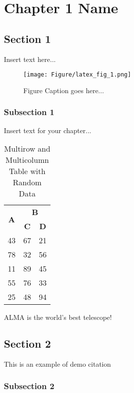 \chapter{Chapter 1 Name}
\label{ch1}

\section{Section 1}

Insert text here...

\begin{figure}[h]
    \centering
    \texttt{[image: Figure/latex\_fig\_1.png]}
    \caption{Figure Caption goes here...}
    \label{fig:enter-label}
\end{figure}


    \subsection{Subsection 1}

    Insert text for your chapter...



\begin{table}[htbp]
    \centering
    \begin{tabular}{|c|c|c|}
        \hline
        \multirow{2}{*}{\textbf{A}} & \multicolumn{2}{c|}{\textbf{B}} \\ \cline{2-3} 
                                    & \textbf{C}       & \textbf{D}       \\ \hline
        43 & 67 & 21 \\ \hline
        78 & 32 & 56 \\ \hline
        11 & 89 & 45 \\ \hline
        55 & 76 & 33 \\ \hline
        25 & 48 & 94 \\ \hline
    \end{tabular}
    \caption{Multirow and Multicolumn Table with Random Data}
    \label{tab:demo_table}
\end{table}


    \ac{ALMA} is the world's best telescope!

\section{Section 2}
This is an example of demo citation \cite{Willighagen_2019_Citation}
    \subsection{Subsection 2}

